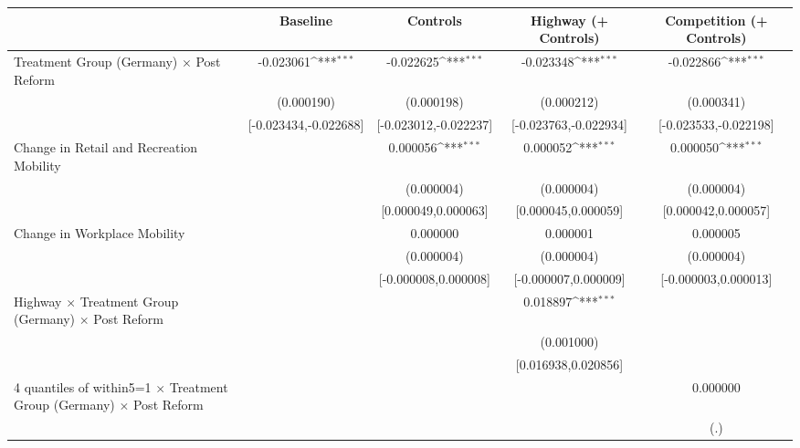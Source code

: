 {
\def\sym#1{\ifmmode^{#1}\else\(^{#1}\)\fi}
\begin{tabular}{l*{4}{c}}
\toprule
                    &\multicolumn{1}{c}{Baseline}&\multicolumn{1}{c}{Controls}&\multicolumn{1}{c}{Highway (+ Controls)}&\multicolumn{1}{c}{Competition (+ Controls)}\\
\midrule
Treatment Group (Germany) $\times$ Post Reform&   -0.023061\sym{***}&   -0.022625\sym{***}&   -0.023348\sym{***}&   -0.022866\sym{***}\\
                    &  (0.000190)         &  (0.000198)         &  (0.000212)         &  (0.000341)         \\
                    &[-0.023434,-0.022688]         &[-0.023012,-0.022237]         &[-0.023763,-0.022934]         &[-0.023533,-0.022198]         \\
Change in Retail and Recreation Mobility&                     &    0.000056\sym{***}&    0.000052\sym{***}&    0.000050\sym{***}\\
                    &                     &  (0.000004)         &  (0.000004)         &  (0.000004)         \\
                    &                     &[0.000049,0.000063]         &[0.000045,0.000059]         &[0.000042,0.000057]         \\
Change in Workplace Mobility&                     &    0.000000         &    0.000001         &    0.000005         \\
                    &                     &  (0.000004)         &  (0.000004)         &  (0.000004)         \\
                    &                     &[-0.000008,0.000008]         &[-0.000007,0.000009]         &[-0.000003,0.000013]         \\
Highway $\times$ Treatment Group (Germany) $\times$ Post Reform&                     &                     &    0.018897\sym{***}&                     \\
                    &                     &                     &  (0.001000)         &                     \\
                    &                     &                     &[0.016938,0.020856]         &                     \\
4 quantiles of within5=1 $\times$ Treatment Group (Germany) $\times$ Post Reform&                     &                     &                     &    0.000000         \\
                    &                     &                     &                     &         (.)         \\

\end{tabular}}
